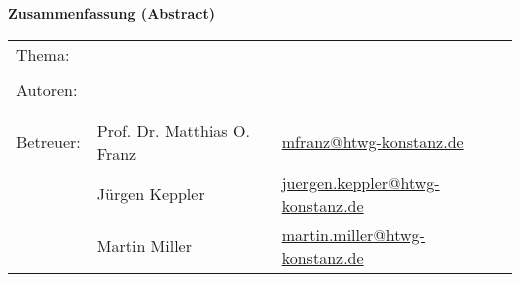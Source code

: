 
\begin{center}
{\Large \textbf{Zusammenfassung (Abstract)}}
\end{center}

\bigskip

\begin{center}
	\begin{tabular}{p{2.8cm}p{5cm}p{5cm}}
		Thema: & \multicolumn{2}{p{10cm}}{\raggedright\strTopic} \\
		 & & \\
		Autoren: & \strAuthorA & \href{mailto:\strAuthorAEmail}{\strAuthorAEmail} \\
		 & \strAuthorB & \href{mailto:\strAuthorBEmail}{\strAuthorBEmail} \\
		 & & \\
		Betreuer: & Prof. Dr. Matthias O. Franz & \href{mailto:mfranz@htwg-konstanz.de}{mfranz@htwg-konstanz.de} \\
		 &  Jürgen Keppler & \href{mailto:juergen.keppler@htwg-konstanz.de}{juergen.keppler@htwg-konstanz.de} \\
		 &  Martin Miller & \href{mailto:martin.miller@htwg-konstanz.de}{martin.miller@htwg-konstanz.de} \\
	\end{tabular}
\end{center}

\bigskip

\noindent
\strAbstract

\thispagestyle{lists}


